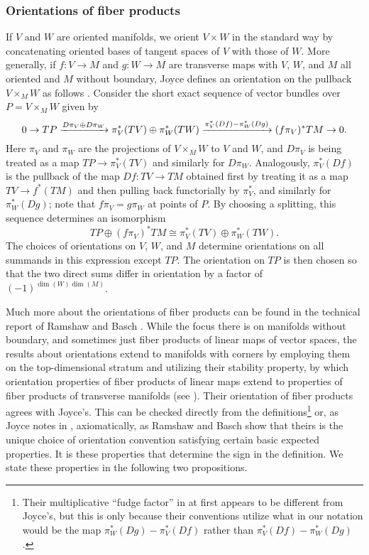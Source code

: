 \subsubsection{Orientations of fiber products}\label{S: orientation of fiber products}

If $V$ and $W$ are oriented manifolds, we orient $V \times W$ in the standard way by concatenating oriented bases of tangent spaces of $V$ with those of $W$.
More generally, if $f \colon V \to M$ and $g \colon W \to M$ are transverse maps with $V$, $W$, and $M$ all oriented and $M$ without boundary, Joyce defines an orientation on the pullback $V \times_M W$ as follows \cite[Convention 7.2b]{Joy12}.
Consider the short exact sequence of vector bundles over $P = V \times_M W$ given by
\begin{equation}\label{E: fiber orientation}
	0 \to TP \xrightarrow{D\pi_V \oplus D\pi_W} \pi_V^*(TV) \oplus \pi_W^*(TW) \xrightarrow{\pi_V^*(Df)-\pi_W^*(Dg)} (f\pi_V)^*TM \to 0.
\end{equation}
Here $\pi_V$ and $\pi_W$ are the projections of $V \times_M W$ to $V$ and $W$, and $D\pi_V$ is being treated as a map $TP \to \pi_V^*(TV)$ and similarly for $D\pi_W$.
Analogously, $\pi_V^*(Df)$ is the pullback of the map $Df \colon TV \to TM$ obtained first by treating it as a map $TV \to f^*(TM)$ and then pulling back functorially by $\pi_V^*$, and similarly for $\pi_W^*(Dg)$; note that $f\pi_V = g\pi_W$ at points of $P$. 
By choosing a splitting, this sequence determines an isomorphism
\begin{equation*}
	TP \oplus (f\pi_V)^*TM\cong\pi_V^*(TV) \oplus \pi_W^*(TW).
\end{equation*}
The choices of orientations on $V$, $W$, and $M$ determine orientations on all summands in this expression except $TP$.
The orientation on $TP$ is then chosen so that the two direct sums differ in orientation by a factor of $(-1)^{\dim(W)\dim(M)}$.

Much more about the orientations of fiber products can be found in the technical report of Ramshaw and Basch \cite{RamBas09}.
While the focus there is on manifolds without boundary, and sometimes just fiber products of linear maps of vector spaces, the results about orientations extend to manifolds with corners by employing them on the top-dimensional stratum and utilizing their stability property, by which orientation properties of fiber products of linear maps extend to properties of fiber products of transverse manifolds (see \cite[Sections 6.3, 9.1.2, and 9.3]{RamBas09}).
Their orientation of fiber products agrees with Joyce's.
This can be checked directly from the definitions\footnote{Their multiplicative ``fudge factor'' in \cite[Theorem 9.14]{RamBas09} at first appears to be different from Joyce's, but this is only because their conventions utilize what in our notation would be the map $\pi_W^*(Dg)-\pi_V^*(Df)$ rather than $\pi_V^*(Df)-\pi_W^*(Dg)$.} or, as Joyce notes in \cite[Remark 7.6.iii]{Joy12}, axiomatically, as Ramshaw and Basch show that theirs is the unique choice of orientation convention satisfying certain basic expected properties.
It is these properties that determine the sign in the definition.
We state these properties in the following two propositions.

